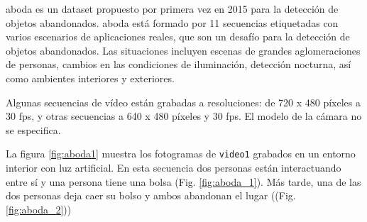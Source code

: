 \gls{aboda} \cite{aboda-dataset} es un dataset propuesto por primera vez en 2015 para la detección de objetos abandonados. \gls{aboda} está formado por 11 secuencias etiquetadas con varios escenarios de aplicaciones reales, que son un desafío para la detección de objetos abandonados. Las situaciones incluyen escenas de grandes aglomeraciones de personas, cambios en las condiciones de iluminación, detección nocturna, así como ambientes interiores y exteriores.

Algunas secuencias de vídeo están grabadas a resoluciones: de 720 x 480 píxeles a 30 \gls{fps}, y otras secuencias a 640 x 480 píxeles y 30 \gls{fps}. El modelo de la cámara no se especifica.

La figura \ref{fig:aboda1} muestra los fotogramas de \texttt{video1} grabados en un entorno interior con luz artificial. En esta secuencia dos personas están interactuando entre sí y una persona tiene una bolsa (Fig. \ref{fig:aboda_1}). Más tarde, una de las dos personas deja caer su bolso y ambos abandonan el lugar ((Fig. \ref{fig:aboda_2}))

